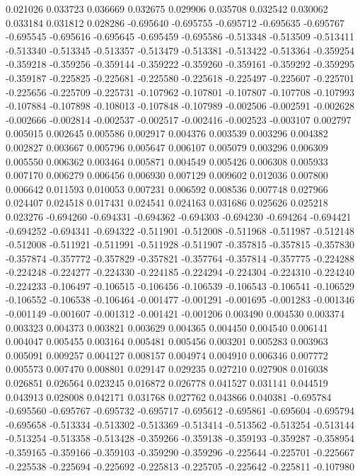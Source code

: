 0.021026
0.033723
0.036669
0.032675
0.029906
0.035708
0.032542
0.030062
0.033184
0.031812
0.028286
-0.695640
-0.695755
-0.695712
-0.695635
-0.695767
-0.695545
-0.695616
-0.695645
-0.695459
-0.695586
-0.513348
-0.513509
-0.513411
-0.513340
-0.513345
-0.513357
-0.513479
-0.513381
-0.513422
-0.513364
-0.359254
-0.359218
-0.359256
-0.359144
-0.359222
-0.359260
-0.359161
-0.359292
-0.359295
-0.359187
-0.225825
-0.225681
-0.225580
-0.225618
-0.225497
-0.225607
-0.225701
-0.225656
-0.225709
-0.225731
-0.107962
-0.107801
-0.107807
-0.107708
-0.107993
-0.107884
-0.107898
-0.108013
-0.107848
-0.107989
-0.002506
-0.002591
-0.002628
-0.002666
-0.002814
-0.002537
-0.002517
-0.002416
-0.002523
-0.003107
0.002797
0.005015
0.002645
0.005586
0.002917
0.004376
0.003539
0.003296
0.004382
0.002827
0.003667
0.005796
0.005647
0.006107
0.005079
0.003296
0.006309
0.005550
0.006362
0.003464
0.005871
0.004549
0.005426
0.006308
0.005933
0.007170
0.006279
0.006456
0.006930
0.007129
0.009602
0.012036
0.007800
0.006642
0.011593
0.010053
0.007231
0.006592
0.008536
0.007748
0.027966
0.024407
0.024518
0.017431
0.024541
0.024163
0.031686
0.025626
0.025218
0.023276
-0.694260
-0.694331
-0.694362
-0.694303
-0.694230
-0.694264
-0.694421
-0.694252
-0.694341
-0.694322
-0.511901
-0.512008
-0.511968
-0.511987
-0.512148
-0.512008
-0.511921
-0.511991
-0.511928
-0.511907
-0.357815
-0.357815
-0.357830
-0.357874
-0.357772
-0.357829
-0.357821
-0.357764
-0.357814
-0.357775
-0.224288
-0.224248
-0.224277
-0.224330
-0.224185
-0.224294
-0.224304
-0.224310
-0.224240
-0.224233
-0.106497
-0.106515
-0.106456
-0.106539
-0.106543
-0.106541
-0.106529
-0.106552
-0.106538
-0.106464
-0.001477
-0.001291
-0.001695
-0.001283
-0.001346
-0.001149
-0.001607
-0.001312
-0.001421
-0.001206
0.003490
0.004530
0.003374
0.003323
0.004373
0.003821
0.003629
0.004365
0.004450
0.004540
0.006141
0.004047
0.005455
0.003164
0.005481
0.005456
0.003201
0.005283
0.003963
0.005091
0.009257
0.004127
0.008157
0.004974
0.004910
0.006346
0.007772
0.005573
0.007470
0.008801
0.029147
0.029235
0.027210
0.027908
0.016038
0.026851
0.026564
0.023245
0.016872
0.026778
0.041527
0.031141
0.044519
0.043913
0.028008
0.042171
0.031768
0.027762
0.043866
0.040381
-0.695784
-0.695560
-0.695767
-0.695732
-0.695717
-0.695612
-0.695861
-0.695604
-0.695794
-0.695658
-0.513334
-0.513302
-0.513369
-0.513414
-0.513562
-0.513254
-0.513144
-0.513254
-0.513358
-0.513428
-0.359266
-0.359138
-0.359193
-0.359287
-0.358954
-0.359165
-0.359166
-0.359103
-0.359290
-0.359296
-0.225644
-0.225701
-0.225667
-0.225538
-0.225694
-0.225692
-0.225813
-0.225705
-0.225642
-0.225811
-0.107980
